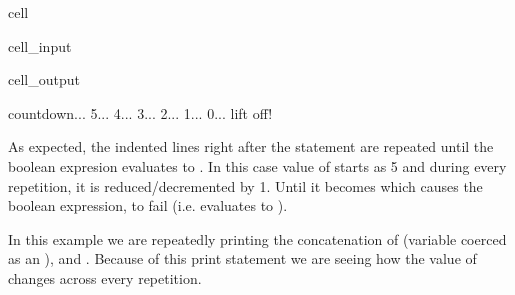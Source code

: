 \documentclass[letterpaper,10pt,english]{jupyterBook}
\begin{document}
\begin{sphinxuseclass}{cell}\begin{sphinxVerbatimInput}

\begin{sphinxuseclass}{cell_input}
\begin{sphinxVerbatim}[commandchars=\\\{\}]
  
   
      
        
\end{sphinxVerbatim}

\end{sphinxuseclass}\end{sphinxVerbatimInput}
\begin{sphinxVerbatimOutput}

\begin{sphinxuseclass}{cell_output}
\begin{sphinxVerbatim}[commandchars=\\\{\}]
countdown...
5...
4...
3...
2...
1...
0...
lift off!
\end{sphinxVerbatim}

\end{sphinxuseclass}\end{sphinxVerbatimOutput}

\end{sphinxuseclass}
\sphinxAtStartPar
As expected, the indented lines right after the  statement are repeated until the boolean expresion  evaluates to . In this case value of  starts as 5 and during every repetition, it is reduced/decremented by 1. Until it becomes  which causes the boolean expression,  to fail (i.e. evaluates to ).

\sphinxAtStartPar
In this example we are repeatedly printing the concatenation of  (variable  coerced as an ), and . Because of this print statement we are seeing how the value of  changes across every repetition.
\end{document}
